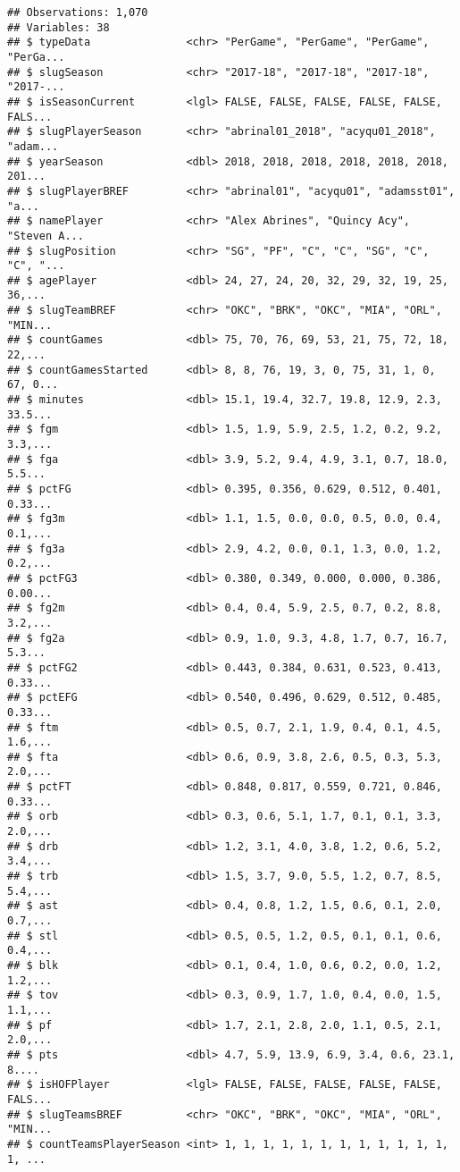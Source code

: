 \documentclass[]{article}
\begin{document}
\begin{verbatim}
## Observations: 1,070
## Variables: 38
## $ typeData               <chr> "PerGame", "PerGame", "PerGame", "PerGa...
## $ slugSeason             <chr> "2017-18", "2017-18", "2017-18", "2017-...
## $ isSeasonCurrent        <lgl> FALSE, FALSE, FALSE, FALSE, FALSE, FALS...
## $ slugPlayerSeason       <chr> "abrinal01_2018", "acyqu01_2018", "adam...
## $ yearSeason             <dbl> 2018, 2018, 2018, 2018, 2018, 2018, 201...
## $ slugPlayerBREF         <chr> "abrinal01", "acyqu01", "adamsst01", "a...
## $ namePlayer             <chr> "Alex Abrines", "Quincy Acy", "Steven A...
## $ slugPosition           <chr> "SG", "PF", "C", "C", "SG", "C", "C", "...
## $ agePlayer              <dbl> 24, 27, 24, 20, 32, 29, 32, 19, 25, 36,...
## $ slugTeamBREF           <chr> "OKC", "BRK", "OKC", "MIA", "ORL", "MIN...
## $ countGames             <dbl> 75, 70, 76, 69, 53, 21, 75, 72, 18, 22,...
## $ countGamesStarted      <dbl> 8, 8, 76, 19, 3, 0, 75, 31, 1, 0, 67, 0...
## $ minutes                <dbl> 15.1, 19.4, 32.7, 19.8, 12.9, 2.3, 33.5...
## $ fgm                    <dbl> 1.5, 1.9, 5.9, 2.5, 1.2, 0.2, 9.2, 3.3,...
## $ fga                    <dbl> 3.9, 5.2, 9.4, 4.9, 3.1, 0.7, 18.0, 5.5...
## $ pctFG                  <dbl> 0.395, 0.356, 0.629, 0.512, 0.401, 0.33...
## $ fg3m                   <dbl> 1.1, 1.5, 0.0, 0.0, 0.5, 0.0, 0.4, 0.1,...
## $ fg3a                   <dbl> 2.9, 4.2, 0.0, 0.1, 1.3, 0.0, 1.2, 0.2,...
## $ pctFG3                 <dbl> 0.380, 0.349, 0.000, 0.000, 0.386, 0.00...
## $ fg2m                   <dbl> 0.4, 0.4, 5.9, 2.5, 0.7, 0.2, 8.8, 3.2,...
## $ fg2a                   <dbl> 0.9, 1.0, 9.3, 4.8, 1.7, 0.7, 16.7, 5.3...
## $ pctFG2                 <dbl> 0.443, 0.384, 0.631, 0.523, 0.413, 0.33...
## $ pctEFG                 <dbl> 0.540, 0.496, 0.629, 0.512, 0.485, 0.33...
## $ ftm                    <dbl> 0.5, 0.7, 2.1, 1.9, 0.4, 0.1, 4.5, 1.6,...
## $ fta                    <dbl> 0.6, 0.9, 3.8, 2.6, 0.5, 0.3, 5.3, 2.0,...
## $ pctFT                  <dbl> 0.848, 0.817, 0.559, 0.721, 0.846, 0.33...
## $ orb                    <dbl> 0.3, 0.6, 5.1, 1.7, 0.1, 0.1, 3.3, 2.0,...
## $ drb                    <dbl> 1.2, 3.1, 4.0, 3.8, 1.2, 0.6, 5.2, 3.4,...
## $ trb                    <dbl> 1.5, 3.7, 9.0, 5.5, 1.2, 0.7, 8.5, 5.4,...
## $ ast                    <dbl> 0.4, 0.8, 1.2, 1.5, 0.6, 0.1, 2.0, 0.7,...
## $ stl                    <dbl> 0.5, 0.5, 1.2, 0.5, 0.1, 0.1, 0.6, 0.4,...
## $ blk                    <dbl> 0.1, 0.4, 1.0, 0.6, 0.2, 0.0, 1.2, 1.2,...
## $ tov                    <dbl> 0.3, 0.9, 1.7, 1.0, 0.4, 0.0, 1.5, 1.1,...
## $ pf                     <dbl> 1.7, 2.1, 2.8, 2.0, 1.1, 0.5, 2.1, 2.0,...
## $ pts                    <dbl> 4.7, 5.9, 13.9, 6.9, 3.4, 0.6, 23.1, 8....
## $ isHOFPlayer            <lgl> FALSE, FALSE, FALSE, FALSE, FALSE, FALS...
## $ slugTeamsBREF          <chr> "OKC", "BRK", "OKC", "MIA", "ORL", "MIN...
## $ countTeamsPlayerSeason <int> 1, 1, 1, 1, 1, 1, 1, 1, 1, 1, 1, 1, 1, ...
\end{verbatim}
\end{document}
